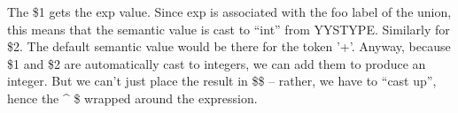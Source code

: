 \documentclass[titlepage,10pt]{article}
\begin{document}
The \$1 gets the exp value.  Since exp is associated with the foo label
of the union, this means that the semantic value is cast to ``int'' from
YYSTYPE.  Similarly for \$2.  The default semantic value would be there
for the token '+'.  Anyway, because \$1 and \$2 are automatically cast
to integers, we can add them to produce an integer.  But we can't just
place the result in \$\$ -- rather, we have to ``cast up'', hence the
\^{} \$ wrapped around the expression.

\end{document}
